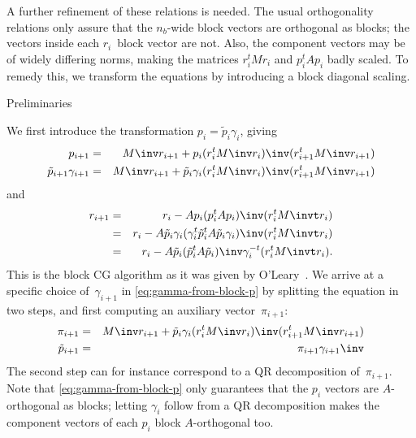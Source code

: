 \documentclass[11pt]{artikel3}
\begin{document}
\begin{Outline}
A further refinement of these relations is needed. 
The usual orthogonality relations only assure that the $n_b$-wide block vectors
are orthogonal as blocks; the vectors inside each $r_i$~block vector are not.
Also, the component vectors may be of widely differing norms, making the 
matrices $r_i^tMr_i$ and $p_i^tAp_i$ badly scaled. To remedy this,
we transform the equations by introducing a block diagonal scaling.

 {Preliminaries}

We first introduce the transformation $p_i=\tilde p_i\gamma_i$, giving
\begin{eqnarray}
    p_{i+1}&=&M\inv r_{i+1}+p_i(r_i^tM\inv r_i)\inv(r_{i+1}^tM\inv r_{i+1})
                                       \nonumber\\
    \tilde p_{i+1}\gamma_{i+1}&=&M\inv r_{i+1}
        +\tilde p_i\gamma_i(r_i^tM\inv r_i)\inv(r_{i+1}^tM\inv r_{i+1})
                                       \label{eq:gamma-from-block-p}
\end{eqnarray}
and
\begin{eqnarray*}
    r_{i+1}&=&r_i-Ap_i(p_i^tAp_i)\inv(r_i^tM\invt r_i)\\
    &=&r_i-A\tilde p_i\gamma_i(\gamma_i^t\tilde p_i^tA\tilde p_i\gamma_i)\inv
                (r_i^tM\invt r_i)\\
    &=&r_i-A\tilde p_i(\tilde p_i^tA\tilde p_i)\inv\gamma_i^{-t}
                (r_i^tM\invt r_i).
\end{eqnarray*}
This is the block CG algorithm as it was given by
O'Leary~\cite{OLeary1980:blockcg}.  We arrive at a specific choice
of~$\gamma_{i+1}$ in \eqref{eq:gamma-from-block-p} by splitting the
equation in two steps, and first computing an auxiliary
vector~$\pi_{i+1}$:
\begin{eqnarray*}
    \pi_{i+1}&=&M\inv r_{i+1}
        +\tilde p_i\gamma_i(r_i^tM\inv r_i)\inv(r_{i+1}^tM\inv r_{i+1})\\
\tilde p_{i+1}&=&\pi_{i+1}\gamma_{i+1}\inv
\end{eqnarray*}
The second step can for instance correspond to a QR decomposition 
of~$\pi_{i+1}$. Note that \eqref{eq:gamma-from-block-p} only
guarantees that the $p_i$ vectors are $A$-orthogonal as blocks;
letting $\gamma_i$ follow from a QR decomposition makes the component
vectors of each $p_i$ block $A$-orthogonal too.


\end{Outline}
\end{document}
